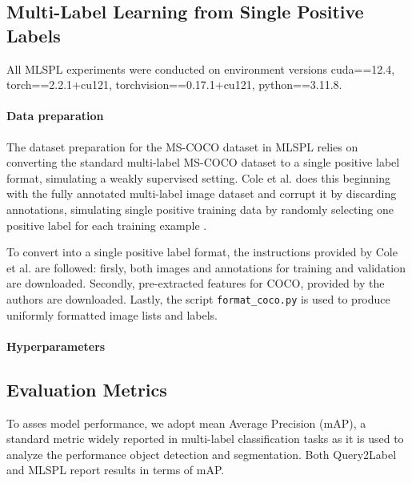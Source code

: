 \documentclass[lettersize,journal]{IEEEtran}
\begin{document}

\subsection{Multi-Label Learning from Single Positive Labels}
All MLSPL experiments were conducted on environment versions cuda==12.4, torch==2.2.1+cu121, torchvision==0.17.1+cu121, python==3.11.8.
\paragraph{Data preparation}
The dataset preparation for the MS-COCO dataset in MLSPL relies on converting the standard multi-label MS-COCO dataset to a single positive label format, simulating a weakly supervised setting. Cole et al. does this beginning with the fully annotated multi-label image dataset and corrupt it by discarding annotations, simulating single positive training data by randomly selecting one positive label for each training example \cite{mlsp}.

To convert into a single positive label format, the instructions provided by Cole et al. are followed: firsly, both images and annotations for training and validation are downloaded. Secondly, pre-extracted features for COCO, provided by the authors are downloaded. Lastly, the script \texttt{format\_coco.py} is used to produce uniformly formatted image lists and labels.

\paragraph{Hyperparameters}

\subsection{Evaluation Metrics}
To asses model performance, we adopt mean Average Precision (mAP), a standard metric widely reported in multi-label classification tasks as it is used to analyze the performance object detection and segmentation. Both Query2Label and MLSPL report results in terms of mAP. 

\end{document}
